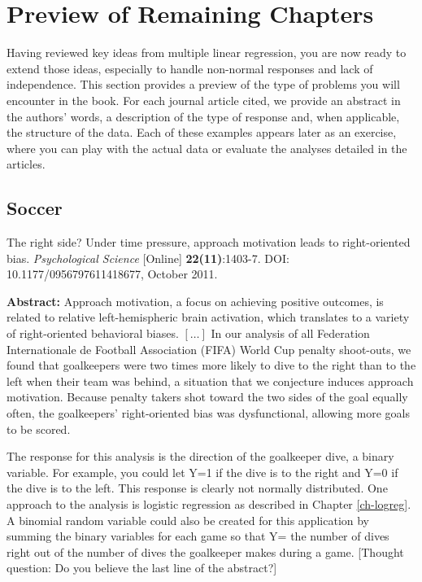 \documentclass[
]{krantz}
\renewenvironment{quote}{\begin{VF}}{\end{VF}}
\begin{document}
\section{Preview of Remaining Chapters}\label{preview-of-remaining-chapters}

Having reviewed key ideas from multiple linear regression, you are now ready to extend those ideas, especially to handle non-normal responses and lack of independence. This section provides a preview of the type of problems you will encounter in the book. For each journal article cited, we provide an abstract in the authors' words, a description of the type of response and, when applicable, the structure of the data. Each of these examples appears later as an exercise, where you can play with the actual data or evaluate the analyses detailed in the articles.

\subsection{Soccer}\label{soccer}

\citet{Roskes2011} The right side? Under time pressure, approach motivation leads to right-oriented bias. \emph{Psychological Science} {[}Online{]} \textbf{22(11)}:1403-7. DOI: 10.1177/0956797611418677, October 2011.

\begin{quote}
\textbf{Abstract:} Approach motivation, a focus on achieving positive outcomes, is related to relative left-hemispheric brain activation, which translates to a variety of right-oriented behavioral biases. \([\ldots]\) In our analysis of all Federation Internationale de Football Association (FIFA) World Cup penalty shoot-outs, we found that goalkeepers were two times more likely to dive to the right than to the left when their team was behind, a situation that we conjecture induces approach motivation. Because penalty takers shot toward the two sides of the goal equally often, the goalkeepers' right-oriented bias was dysfunctional, allowing more goals to be scored.
\end{quote}

The response for this analysis is the direction of the goalkeeper dive, a binary variable. For example, you could let Y=1 if the dive is to the right and Y=0 if the dive is to the left. This response is clearly not normally distributed. One approach to the analysis is logistic regression as described in Chapter \ref{ch-logreg}. A binomial random variable could also be created for this application by summing the binary variables for each game so that Y= the number of dives right out of the number of dives the goalkeeper makes during a game. {[}Thought question: Do you believe the last line of the abstract?{]}
\end{document}
